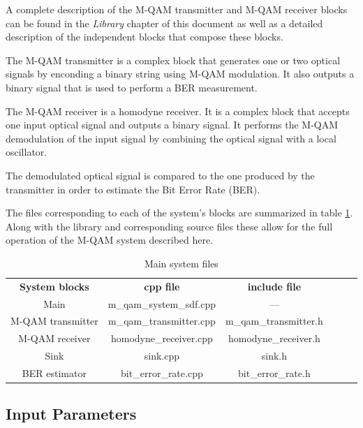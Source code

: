 A complete description of the M-QAM transmitter and M-QAM receiver blocks can be found in the \textit{Library} chapter of this document as well as a detailed description of the independent blocks that compose these blocks.

The M-QAM transmitter is a complex block that generates one or two optical signals by enconding a binary string using M-QAM modulation. It also outputs a binary signal that is used to perform a BER measurement.

The M-QAM receiver is a homodyne receiver. It is a complex block that accepts one input optical signal and outputs
a binary signal. It performs the M-QAM demodulation of the input signal by combining the optical signal with a local oscillator.

The demodulated optical signal is compared to the one produced by the transmitter in order to estimate the Bit Error Rate (BER).

The files corresponding to each of the system's blocks are summarized in table \ref{files_table}. Along with the library and corresponding source files these allow for the full operation of the M-QAM system described here.

\begin{table}[]
	\centering
	\label{files_table}
	\caption{Main system files}
	\begin{tabular}{|c|c|c|ccc}
		\cline{1-3}
		\textbf{System blocks} & \textbf{cpp file} & \textbf{include file}  &  \\ \cline{1-3}
		Main & m\_qam\_system\_sdf.cpp & --- &  \\ \cline{1-3}
		M-QAM transmitter & m\_qam\_transmitter.cpp & m\_qam\_transmitter.h &  \\ \cline{1-3}
		M-QAM receiver & homodyne\_receiver.cpp & homodyne\_receiver.h &   \\ \cline{1-3}
		Sink & sink.cpp & sink.h &   \\ \cline{1-3}
		BER estimator & bit\_error\_rate.cpp & bit\_error\_rate.h &  \\ \cline{1-3}
	\end{tabular}
\end{table}

\subsection{Input Parameters}

